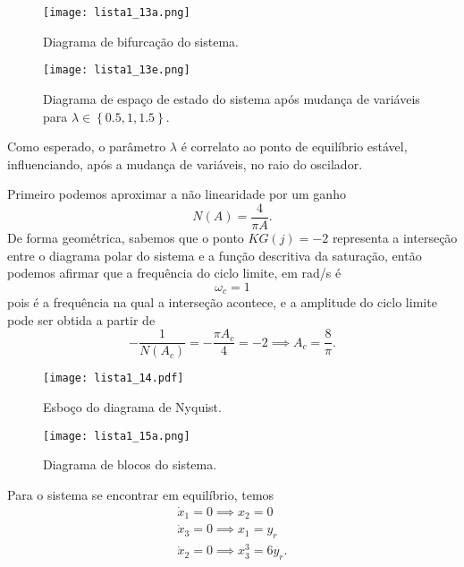 \documentclass[a4paper]{report}
\begin{document}
\begin{figure}[H]
    \centering
    \texttt{[image: lista1\_13a.png]}
    \caption{Diagrama de bifurcação do sistema.}
    \label{fig:lista1_13a-png}
\end{figure}


\begin{figure}[H]
    \centering
    \texttt{[image: lista1\_13e.png]}
    \caption{Diagrama de espaço de estado do sistema após mudança de variáveis para $\lambda \in \left\{ 0.5, 1, 1.5 \right\} $.}
    \label{fig:lista1_13e-png}
\end{figure}

Como esperado, o parâmetro $\lambda$ é correlato ao ponto de equilíbrio estável, influenciando, após a mudança de variáveis, no raio do oscilador.


Primeiro podemos aproximar a não linearidade por um ganho  \[
    N(A) = \frac{4}{\pi A}
.\] De forma geométrica, sabemos que o ponto $KG(j)=-2$ representa a interseção entre o diagrama polar do sistema e a função descritiva da saturação, então podemos afirmar que a frequência do ciclo limite, em rad/s é \[
\omega_c = 1
\] pois é a frequência na qual a interseção acontece, e a amplitude do ciclo limite pode ser obtida a partir de \[
-\frac{1}{N(A_c)} = -\frac{\pi A_c}{4} = -2 \implies A_c = \frac{8}{\pi}
.\] 

\begin{figure}[H]
    \centering
    \texttt{[image: lista1\_14.pdf]}
    \caption{Esboço do diagrama de Nyquist.}
    \label{fig:lista1_14-pdf}
\end{figure}
 


\begin{figure}[H]
    \centering
    \texttt{[image: lista1\_15a.png]}
    \caption{Diagrama de blocos do sistema.}
    \label{fig:lista1_15a-png}
\end{figure}


Para o sistema se encontrar em equilíbrio, temos
\begin{align*}
    \dot{x}_1 = 0 \implies x_2 = 0 \\
    \dot{x}_3 = 0 \implies x_1 = y_r \\
    \dot{x}_2 = 0 \implies x_3^3 = 6y_r
.\end{align*}
\end{document}
